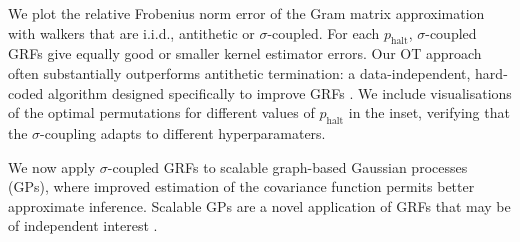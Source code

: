 We plot the relative Frobenius norm error of the Gram matrix approximation  with walkers that are i.i.d., antithetic \citep{reid2023quasi} or $\sigma$-coupled. 
For each $p_\textrm{halt}$, $\sigma$-coupled GRFs give equally good or smaller kernel estimator errors. 
Our OT approach often substantially outperforms antithetic termination: a data-independent, hard-coded algorithm designed specifically to improve GRFs \citep{reid2023quasi}.
We include visualisations of the optimal permutations for different values of $p_\textrm{halt}$ in the inset, verifying that the $\sigma$-coupling adapts to different hyperparamaters.



We now apply $\sigma$-coupled GRFs to scalable graph-based Gaussian processes (GPs), where improved estimation of the covariance function permits better approximate inference.
Scalable GPs are a novel application of GRFs that may be of independent interest \citep{borovitskiy2021matern, mostowsky2024geometrickernels}. %


